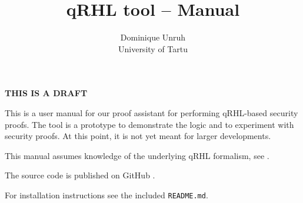 \documentclass{article}
\begin{document}
\title{qRHL tool -- Manual}
\author{Dominique Unruh\\\small University of Tartu}
\date{}


\maketitle

\ifdraft
\begin{center}
  \LARGE\bfseries
  THIS IS A DRAFT
\end{center}
\fi

\let\subsubsection\subsection
\let\subsection\section

\tableofcontents

This is a user manual for our proof assistant for
performing qRHL-based security proofs.  The tool is a prototype to
demonstrate the logic and to experiment with security proofs. At this
point, it is not yet meant for larger developments.

This manual assumes knowledge of the underlying qRHL formalism, see
\cite{qrhl-paper-from-manual}.

The source code is published on GitHub \cite{github-source}.

For installation instructions see the included \texttt{README.md}.






\end{document}
